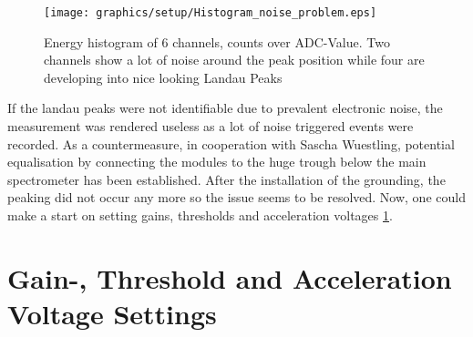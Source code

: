   \begin{figure}
   \centering
   \texttt{[image: graphics/setup/Histogram\_noise\_problem.eps]}
   \caption{Energy histogram of 6 channels, counts over ADC-Value. Two channels show a lot of noise around the peak position while four are developing into nice looking Landau Peaks}
  \end{figure}
  If the landau peaks were not identifiable due to prevalent electronic noise, the measurement was rendered useless as a lot of noise triggered events were recorded.
  As a countermeasure, in cooperation with Sascha Wuestling, potential equalisation by connecting the modules to the huge trough below the main spectrometer has been established. After the installation of the grounding, the peaking did not occur any more so the issue seems to be resolved. Now, one could make a start on setting gains, thresholds and acceleration voltages \ref{ch:Analysis:sec:GainsThresholdsAccVoltages}.
  
  \section{Gain-, Threshold and Acceleration Voltage Settings}
  \label{ch:Analysis:sec:GainsThresholdsAccVoltages}
  
